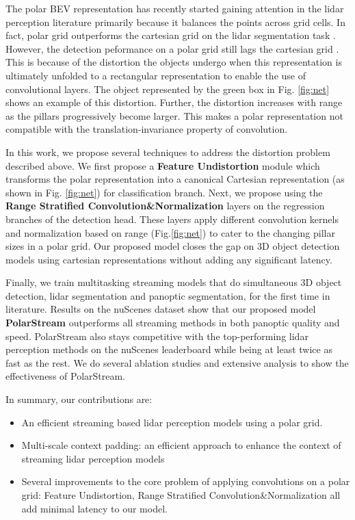 \documentclass{article}
\begin{document}
The polar BEV representation has recently started gaining attention in the lidar perception literature primarily because it balances the points across grid cells. In fact, polar grid outperforms the cartesian grid on the lidar segmentation task \cite{zhang2020polarnet, zhou2020cylinder3d}. However, the detection peformance on a polar grid still lags the cartesian grid \cite{alsfasser2020exploiting, chen2020every, rapoport2020s}. This is because of the distortion the objects undergo when this representation is ultimately unfolded to a rectangular representation to enable the use of convolutional layers. The object represented by the green box in Fig. \ref{fig:net} shows an example of this distortion. Further, the distortion increases with range as the pillars progressively become larger. This makes a polar representation not compatible with the translation-invariance property of convolution.

In this work, we propose several techniques to address the distortion problem described above. We first propose a \textbf{Feature Undistortion} module which transforms the polar representation into a canonical Cartesian representation (as shown in Fig. \ref{fig:net}) for classification branch. Next, we propose using the \textbf{Range Stratified Convolution\&Normalization} layers on the regression branches of the detection head. These layers apply different convolution kernels and normalization based on range (Fig.\ref{fig:net}) to cater to the changing pillar sizes in a polar grid. Our proposed model closes the gap on 3D object detection models using cartesian representations without adding any significant latency. 



Finally, we train multitasking streaming models that do simultaneous 3D object detection, lidar segmentation and panoptic segmentation, for the first time in literature. Results on the nuScenes dataset show that our proposed model \textbf{PolarStream} outperforms all streaming methods in both panoptic quality and speed. PolarStream also stays competitive with the top-performing lidar perception methods on the nuScenes leaderboard while being at least twice as fast as the rest. We do several ablation studies and extensive analysis to show the effectiveness of PolarStream.

In summary, our contributions are:
\begin{itemize}[leftmargin=*]
\itemsep0em 
\vspace{-3mm}
\item An efficient streaming based lidar perception models using a polar grid.
\item Multi-scale context padding: an efficient approach to enhance the context of streaming lidar perception models
\item Several improvements to the core problem of applying convolutions on a polar grid: Feature Undistortion, Range Stratified Convolution\&Normalization all add minimal latency to our model.
\end{itemize}
\end{document}
